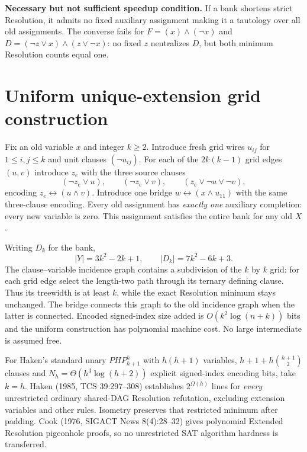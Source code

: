 \documentclass{article}
\begin{document}
\noindent\textbf{Necessary but not sufficient speedup condition.} If a bank shortens strict Resolution, it admits no fixed auxiliary assignment making it a tautology over all old assignments. The converse fails for $F=(x)\wedge(\neg x)$ and $D=(\neg z\vee x)\wedge(z\vee\neg x)$: no fixed $z$ neutralizes $D$, but both minimum Resolution counts equal one.

\section*{Uniform unique-extension grid construction}
Fix an old variable $x$ and integer $k\ge2$. Introduce fresh grid wires $u_{ij}$ for $1\le i,j\le k$ and unit clauses $(\neg u_{ij})$. For each of the $2k(k-1)$ grid edges $(u,v)$ introduce $z_e$ with the three source clauses
\[
(\neg z_e\vee u),\qquad(\neg z_e\vee v),\qquad
(z_e\vee\neg u\vee\neg v),
\]
encoding $z_e\leftrightarrow(u\land v)$. Introduce one bridge $w\leftrightarrow(x\land u_{11})$ with the same three-clause encoding. Every old assignment has \emph{exactly one} auxiliary completion: every new variable is zero. This assignment satisfies the entire bank for any old $X$.

Writing $D_k$ for the bank,
\[
|Y|=3k^2-2k+1,\qquad
|D_k|=7k^2-6k+3.
\]
The clause--variable incidence graph contains a subdivision of the $k$ by $k$ grid: for each grid edge select the length-two path through its ternary defining clause. Thus its treewidth is at least $k$, while the exact Resolution minimum stays unchanged. The bridge connects this graph to the old incidence graph when the latter is connected. Encoded signed-index size added is $O(k^2\log(n+k))$ bits and the uniform construction has polynomial machine cost. No large intermediate is assumed free.

For Haken's standard unary $PHP_{h+1}^h$ with $h(h+1)$ variables, $h+1+h\binom{h+1}{2}$ clauses and $N_h=\Theta(h^3\log(h+2))$ explicit signed-index encoding bits, take $k=h$. Haken (1985, TCS 39:297--308) establishes $2^{\Omega(h)}$ lines for \emph{every} unrestricted ordinary shared-DAG Resolution refutation, excluding extension variables and other rules. Isometry preserves that restricted minimum after padding. Cook (1976, SIGACT News 8(4):28--32) gives polynomial Extended Resolution pigeonhole proofs, so no unrestricted SAT algorithm hardness is transferred.
\end{document}
